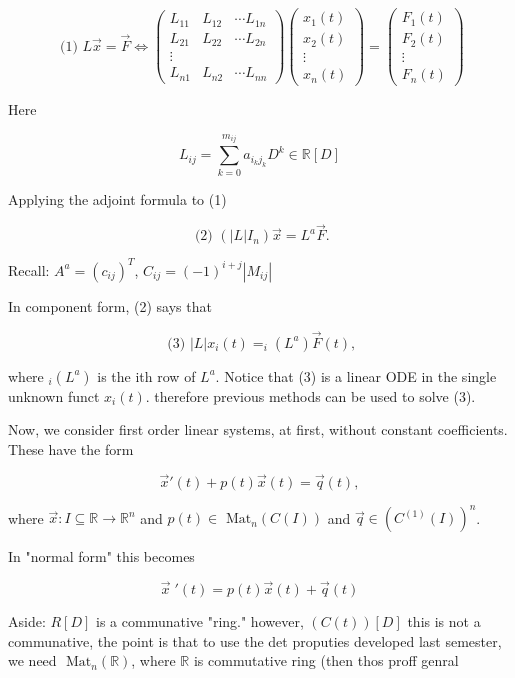 \begin{example}
\[ \text{ (1) }
L \vec{x} = \vec{F} \iff 
\begin{pmatrix}
  L_{11} & L_{12} & \cdots L_{1n} \\
  L_{21} & L_{22} & \cdots L_{2n} \\
  \vdots & \\
  L_{n1} & L_{n2} & \cdots L_{nn} 
\end{pmatrix}
\begin{pmatrix}
  x_1(t) \\
  x_2(t) \\
  \vdots \\
  x_n(t)
\end{pmatrix}
=
\begin{pmatrix}
  F_1(t) \\
  F_2(t) \\
  \vdots \\
  F_n(t)
\end{pmatrix}
\]

Here 

\[ L_{ij} = \sum_{k=0}^{m_{ij}} a_{i_k j_k} D^k \in \mathbb{R}[D] \]

Applying the adjoint formula to (1) 

\[ \text{ (2) } (|L|I_n) \vec{x} = L^a \vec{F}. \]

Recall: \( A^a = (c_{ij})^T \), \( C_{ij} = (-1)^{i+j} |M_{ij}| \)

In component form, (2) says that 

\[ \text{ (3) } |L|x_i(t) = _i(L^a) \vec{F}(t) ,\]

where \( _i(L^a) \) is the ith row of \( L^a \). Notice that (3) is a
linear ODE in the single unknown funct \( x_i(t) \). therefore previous
methods can be used to solve (3). 
\end{example}


Now, we consider first order linear systems, at first, without constant
coefficients. These have the form 

\[ \vec{x}'(t) + p(t) \vec{x}(t) = \vec{q}(t),  \]

where \( \vec{x}: I \subseteq \mathbb{R} \to \mathbb{R}^n \) and \( p(t)
\in \text{ Mat}_n (C(I)) \) and \( \vec{q} \in ( C^{(1)}(I))^n \). 

In "normal form" this becomes 

\[   \vec{x} \;'(t) = p(t) \vec{x}(t) + \vec{q}(t) \]



Aside: \( R[D] \) is a communative "ring." however, \( (C(t))[D] \) this
is not a communative, the point is that to use the det proputies
developed last semester, we need \( \text{ Mat}_n( \mathbb{R}) \), where
\( \mathbb{R} \) is commutative ring (then thos proff genral

